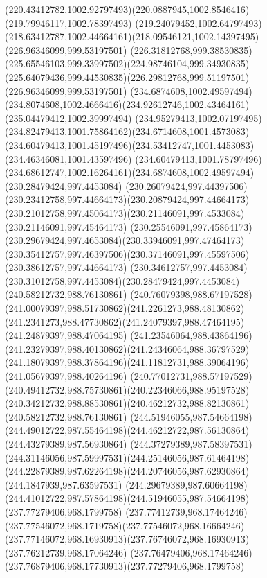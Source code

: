 {{		\curveto(220.43412782,1002.92797493)(220.0887945,1002.8546416)(219.79946117,1002.78397493)
		\curveto(219.24079452,1002.64797493)(218.63412787,1002.44664161)(218.09546121,1002.14397495)
		\moveto(226.96346099,999.53197501)
		\curveto(226.31812768,999.38530835)(225.65546103,999.33997502)(224.98746104,999.34930835)
		\curveto(225.64079436,999.44530835)(226.29812768,999.51197501)(226.96346099,999.53197501)
		\moveto(234.6874608,1002.49597494)
		\curveto(234.8074608,1002.4666416)(234.92612746,1002.43464161)(235.04479412,1002.39997494)
		\curveto(234.95279413,1002.07197495)(234.82479413,1001.75864162)(234.6714608,1001.4573083)
		\curveto(234.60479413,1001.45197496)(234.53412747,1001.4453083)(234.46346081,1001.43597496)
		\curveto(234.60479413,1001.78797496)(234.68612747,1002.16264161)(234.6874608,1002.49597494)
		\moveto(230.28479424,997.4453084)
		\curveto(230.26079424,997.44397506)(230.23412758,997.44664173)(230.20879424,997.44664173)
		\curveto(230.21012758,997.45064173)(230.21146091,997.4533084)(230.21146091,997.45464173)
		\curveto(230.25546091,997.45864173)(230.29679424,997.4653084)(230.33946091,997.47464173)
		\curveto(230.35412757,997.46397506)(230.37146091,997.45597506)(230.38612757,997.44664173)
		\curveto(230.34612757,997.4453084)(230.31012758,997.4453084)(230.28479424,997.4453084)
		\moveto(240.58212732,988.76130861)
		\curveto(240.76079398,988.67197528)(241.00079397,988.51730862)(241.2261273,988.48130862)
		\curveto(241.2341273,988.47730862)(241.24079397,988.47464195)(241.24879397,988.47064195)
		\curveto(241.23546064,988.43864196)(241.23279397,988.40130862)(241.24346064,988.36797529)
		\curveto(241.18079397,988.37864196)(241.11812731,988.39064196)(241.05679397,988.40264196)
		\curveto(240.77012731,988.57197529)(240.49412732,988.75730861)(240.22346066,988.95197528)
		\curveto(240.34212732,988.88530861)(240.46212732,988.82130861)(240.58212732,988.76130861)
		\moveto(244.51946055,987.54664198)
		\curveto(244.49012722,987.55464198)(244.46212722,987.56130864)(244.43279389,987.56930864)
		\curveto(244.37279389,987.58397531)(244.31146056,987.59997531)(244.25146056,987.61464198)
		\curveto(244.22879389,987.62264198)(244.20746056,987.62930864)(244.1847939,987.63597531)
		\curveto(244.29679389,987.60664198)(244.41012722,987.57864198)(244.51946055,987.54664198)
		\moveto(237.77279406,968.1799758)
		\curveto(237.77412739,968.17464246)(237.77546072,968.1719758)(237.77546072,968.16664246)
		\curveto(237.77146072,968.16930913)(237.76746072,968.16930913)(237.76212739,968.17064246)
		\curveto(237.76479406,968.17464246)(237.76879406,968.17730913)(237.77279406,968.1799758)
}}
